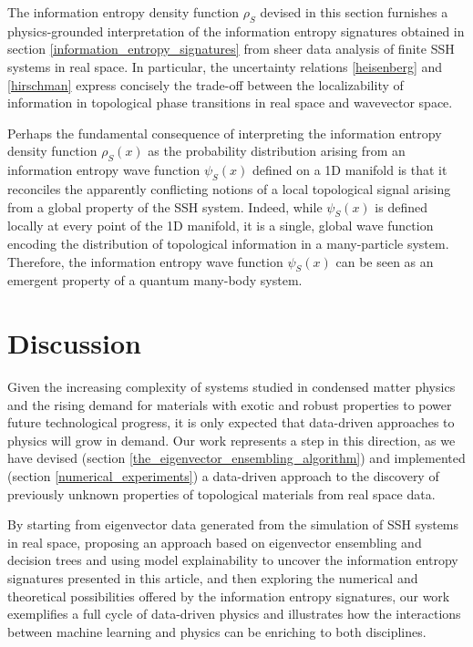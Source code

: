 \documentclass[10pt]{revtex4-1}
\begin{document}
The information entropy density function $\rho_S$ devised in this section furnishes a physics-grounded interpretation of the information entropy signatures obtained in section \ref{information_entropy_signatures} from sheer data analysis of finite SSH systems in real space. In particular, the uncertainty relations \eqref{heisenberg} and \eqref{hirschman} express concisely the trade-off between the localizability of information in topological phase transitions in real space and wavevector space. 

Perhaps the fundamental consequence of interpreting the information entropy density function $\rho_S(x)$ as the probability distribution arising from an information entropy wave function $\psi_S(x)$ defined on a 1D manifold is that it reconciles the apparently conflicting notions of a local topological signal arising from a global property of the SSH system. Indeed, while $\psi_S(x)$ is defined locally at every point of the 1D manifold, it is a single, global wave function encoding the distribution of topological information in a many-particle system. Therefore, the information entropy wave function $\psi_S(x)$ can be seen as an emergent property of a quantum many-body system.    

\section{Discussion}
\label{discussion}

Given the increasing complexity of systems studied in condensed matter physics and the rising demand for materials with exotic and robust properties to power future technological progress, it is only expected that data-driven approaches to physics will grow in demand. Our work represents a step in this direction, as we have devised (section \ref{the_eigenvector_ensembling_algorithm}) and implemented (section \ref{numerical_experiments}) a data-driven approach to the discovery of previously unknown properties of topological materials from real space data.

By starting from eigenvector data generated from the simulation of SSH systems in real space, proposing an approach based on eigenvector ensembling and decision trees and using model explainability to uncover the information entropy signatures presented in this article, and then exploring the numerical and theoretical possibilities offered by the information entropy signatures, our work exemplifies a full cycle of data-driven physics and illustrates how the interactions between machine learning and physics can be enriching to both disciplines.      
 
\end{document}
